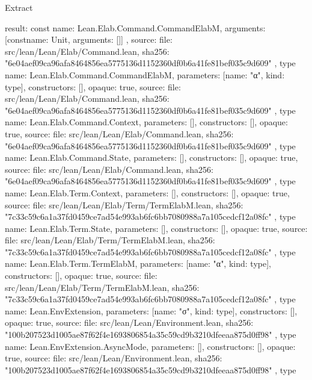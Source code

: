 \begin{lexlean}{Extract}
\begin{toolingmodule}
{{{        result: const{
          name: Lean.Elab.Command.CommandElabM,
          arguments: [const{name: Unit, arguments: []}]
        }
      },
      source: {
        file: src/lean/Lean/Elab/Command.lean,
        sha256: "6e04aef09ca96afa8464856ea5775136d1152360df0b6a41fe81bef035c9d609"
      }
    },
    type{
      name: Lean.Elab.Command.CommandElabM,
      parameters: [{name: "α", kind: type{}}],
      constructors: [],
      opaque: true,
      source: {
        file: src/lean/Lean/Elab/Command.lean,
        sha256: "6e04aef09ca96afa8464856ea5775136d1152360df0b6a41fe81bef035c9d609"
      }
    },
    type{
      name: Lean.Elab.Command.Context,
      parameters: [],
      constructors: [],
      opaque: true,
      source: {
        file: src/lean/Lean/Elab/Command.lean,
        sha256: "6e04aef09ca96afa8464856ea5775136d1152360df0b6a41fe81bef035c9d609"
      }
    },
    type{
      name: Lean.Elab.Command.State,
      parameters: [],
      constructors: [],
      opaque: true,
      source: {
        file: src/lean/Lean/Elab/Command.lean,
        sha256: "6e04aef09ca96afa8464856ea5775136d1152360df0b6a41fe81bef035c9d609"
      }
    },
    type{
      name: Lean.Elab.Term.Context,
      parameters: [],
      constructors: [],
      opaque: true,
      source: {
        file: src/lean/Lean/Elab/Term/TermElabM.lean,
        sha256: "7c33c59c6a1a37fd0459ce7ad54e993ab6fc6bb7080988a7a105cedcf12a08fc"
      }
    },
    type{
      name: Lean.Elab.Term.State,
      parameters: [],
      constructors: [],
      opaque: true,
      source: {
        file: src/lean/Lean/Elab/Term/TermElabM.lean,
        sha256: "7c33c59c6a1a37fd0459ce7ad54e993ab6fc6bb7080988a7a105cedcf12a08fc"
      }
    },
    type{
      name: Lean.Elab.Term.TermElabM,
      parameters: [{name: "α", kind: type{}}],
      constructors: [],
      opaque: true,
      source: {
        file: src/lean/Lean/Elab/Term/TermElabM.lean,
        sha256: "7c33c59c6a1a37fd0459ce7ad54e993ab6fc6bb7080988a7a105cedcf12a08fc"
      }
    },
    type{
      name: Lean.EnvExtension,
      parameters: [{name: "σ", kind: type{}}],
      constructors: [],
      opaque: true,
      source: {
        file: src/lean/Lean/Environment.lean,
        sha256: "100b207523d1005ae87f62f4e1693806854a35c59cd9b3210dfeeaa875d0ff98"
      }
    },
    type{
      name: Lean.EnvExtension.AsyncMode,
      parameters: [],
      constructors: [],
      opaque: true,
      source: {
        file: src/lean/Lean/Environment.lean,
        sha256: "100b207523d1005ae87f62f4e1693806854a35c59cd9b3210dfeeaa875d0ff98"
      }
    },
    type{
}}
\end{toolingmodule}
\end{lexlean}
